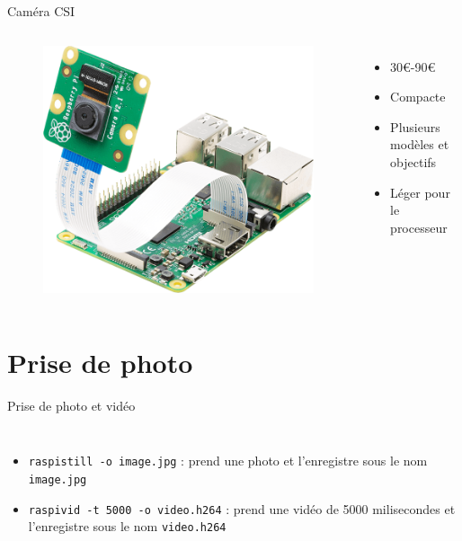 \documentclass[aspectratio=169,xcolor=dvipsnames]{beamer}
\begin{document}
\begin{frame}{Caméra CSI}
    \begin{columns}[c] %

        \begin{figure}
            \includegraphics[width=0.6\linewidth]{images/camera-csi.png}
        \end{figure}

        \begin{itemize}
            \item 30€-90€
            \item Compacte
            \item Plusieurs modèles et objectifs
            \item Léger pour le processeur
        \end{itemize}

    \end{columns}
\end{frame}


\section{Prise de photo}

\begin{frame}{Prise de photo et vidéo}
    \begin{columns}[c] %

        \begin{itemize}
            \item \texttt{raspistill -o image.jpg} : prend une photo et l'enregistre sous le nom \texttt{image.jpg}
            \item \texttt{raspivid -t 5000 -o video.h264} : prend une vidéo de 5000 milisecondes et l'enregistre sous le nom \texttt{video.h264}
        \end{itemize}

    \end{columns}
\end{frame}
\end{document}

